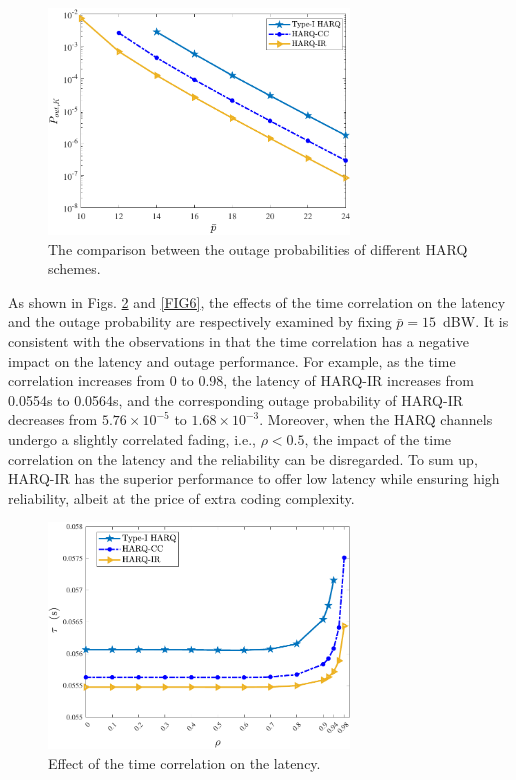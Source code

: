 \documentclass[conference]{IEEEtran}
\begin{document}
\begin{figure}[htbp]
    \centering
    \includegraphics[width=8cm]{power-outage.pdf}
    \caption{The comparison between the outage probabilities of different
HARQ schemes.}
    \label{FIG3} %
\end{figure}
As shown in Figs. \ref{FIG5} and \ref{FIG6}, the effects of the time correlation on the latency and the outage probability are respectively examined by fixing ${\bar p}=15$~dBW. It is consistent with the observations in\cite{7448651,7833558,7959548} that the time correlation has a negative impact on the latency and outage performance. For example, as the time correlation increases from 0 to 0.98, the latency of HARQ-IR increases from 0.0554s to 0.0564s, and the corresponding outage probability of HARQ-IR decreases from $5.76 \times {10^{ - 5}}$
 to $1.68 \times {10^{ - 3}}$. Moreover, when the HARQ channels undergo a slightly correlated fading, i.e., $\rho<0.5$, the impact of the time correlation on the latency and the reliability can be disregarded. To sum up, HARQ-IR has the superior performance to offer low latency while ensuring high reliability, albeit at the price of extra coding complexity.%

\begin{figure}[htbp]
    \centering
    \includegraphics[width=8cm]{factor-delay1.pdf}
    \caption{Effect of the time correlation on the latency.}
    \label{FIG5} %
\end{figure}
\end{document}
